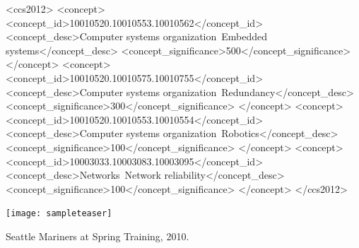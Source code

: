 \renewcommand{\shortauthors}{Trovato and Tobin, et al.}

\begin{abstract}
	A clear and well-documented \LaTeX\ document is presented as an
	article formatted for publication by ACM in a conference proceedings
	or journal publication. Based on the ``acmart'' document class, this
	article presents and explains many of the common variations, as well
	as many of the formatting elements an author may use in the
	preparation of the documentation of their work.
\end{abstract}

\begin{CCSXML}
	<ccs2012>
	<concept>
	<concept_id>10010520.10010553.10010562</concept_id>
	<concept_desc>Computer systems organization~Embedded systems</concept_desc>
	<concept_significance>500</concept_significance>
	</concept>
	<concept>
	<concept_id>10010520.10010575.10010755</concept_id>
	<concept_desc>Computer systems organization~Redundancy</concept_desc>
	<concept_significance>300</concept_significance>
	</concept>
	<concept>
	<concept_id>10010520.10010553.10010554</concept_id>
	<concept_desc>Computer systems organization~Robotics</concept_desc>
	<concept_significance>100</concept_significance>
	</concept>
	<concept>
	<concept_id>10003033.10003083.10003095</concept_id>
	<concept_desc>Networks~Network reliability</concept_desc>
	<concept_significance>100</concept_significance>
	</concept>
	</ccs2012>
\end{CCSXML}



\begin{teaserfigure}
	\texttt{[image: sampleteaser]}
	\caption{Seattle Mariners at Spring Training, 2010.}
	\label{fig:teaser}
\end{teaserfigure}

